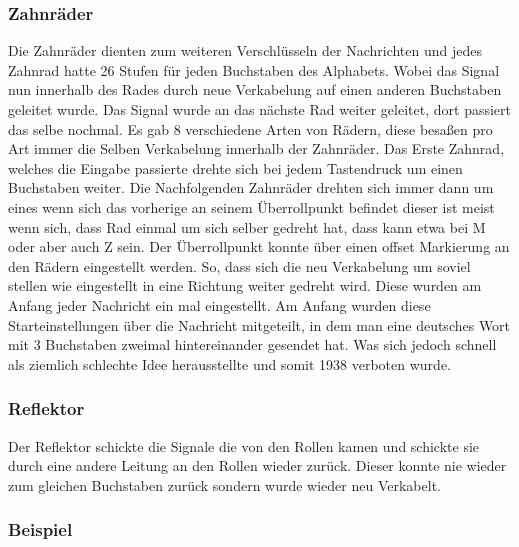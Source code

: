 \subsubsection{Zahnräder}
\label{sec:rader}
Die Zahnräder dienten zum weiteren Verschlüsseln der Nachrichten und jedes Zahnrad hatte 26 Stufen für jeden Buchstaben des Alphabets. Wobei das Signal nun innerhalb des Rades durch neue Verkabelung auf einen anderen Buchstaben geleitet wurde. Das Signal wurde an das nächste Rad weiter geleitet, dort passiert das selbe nochmal. Es gab 8 verschiedene Arten von Rädern, diese besaßen pro Art immer die Selben Verkabelung innerhalb der Zahnräder. Das Erste Zahnrad, welches die Eingabe passierte drehte sich bei jedem Tastendruck um einen Buchstaben weiter. Die Nachfolgenden Zahnräder drehten sich immer dann um eines wenn sich das vorherige an seinem Überrollpunkt befindet dieser ist meist wenn sich, dass Rad einmal um sich selber gedreht hat, dass kann etwa bei M oder aber auch Z sein. Der Überrollpunkt konnte über einen offset Markierung an den Rädern eingestellt werden. So, dass sich die neu Verkabelung um soviel stellen wie eingestellt in eine Richtung weiter gedreht wird. Diese wurden am Anfang jeder Nachricht ein mal eingestellt. Am Anfang wurden diese Starteinstellungen über die Nachricht mitgeteilt, in dem man eine deutsches Wort mit 3 Buchstaben zweimal hintereinander gesendet hat. Was sich jedoch schnell als ziemlich schlechte Idee herausstellte und somit 1938 verboten wurde.

\subsubsection{Reflektor}
Der Reflektor schickte die Signale die von den Rollen kamen und schickte sie durch eine andere Leitung an den Rollen wieder zurück. Dieser konnte nie wieder zum gleichen Buchstaben zurück sondern wurde wieder neu Verkabelt.

\subsubsection{Beispiel}

